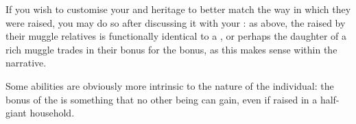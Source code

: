  If you wish to customise your  and heritage to better match the way in which they were raised, you may do so after discussing it with your : as above, the  raised by their muggle relatives is functionally identical to a , or perhaps the  daughter of a rich muggle trades in their  bonus for the  bonus, as this makes sense within the narrative. 
 
 Some abilities are obviously more intrinsic to the nature of the individual: the  bonus of the  is something that no other being can gain, even if raised in a half-giant household. 
